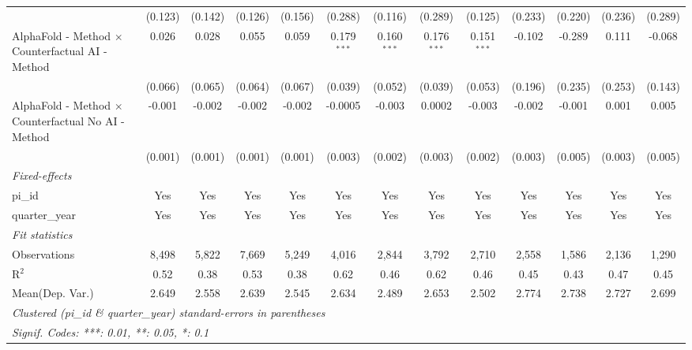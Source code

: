 \begin{tabular}{lcccccccccccc}
                                                              & (0.123)     & (0.142)      & (0.126)     & (0.156)      & (0.288)       & (0.116)       & (0.289)       & (0.125)       & (0.233) & (0.220) & (0.236) & (0.289)\\   
   AlphaFold - Method $\times$ Counterfactual AI - Method     & 0.026       & 0.028        & 0.055       & 0.059        & 0.179$^{***}$ & 0.160$^{***}$ & 0.176$^{***}$ & 0.151$^{***}$ & -0.102  & -0.289  & 0.111   & -0.068\\   
                                                              & (0.066)     & (0.065)      & (0.064)     & (0.067)      & (0.039)       & (0.052)       & (0.039)       & (0.053)       & (0.196) & (0.235) & (0.253) & (0.143)\\   
   AlphaFold - Method $\times$ Counterfactual No AI - Method  & -0.001      & -0.002       & -0.002      & -0.002       & -0.0005       & -0.003        & 0.0002        & -0.003        & -0.002  & -0.001  & 0.001   & 0.005\\   
                                                              & (0.001)     & (0.001)      & (0.001)     & (0.001)      & (0.003)       & (0.002)       & (0.003)       & (0.002)       & (0.003) & (0.005) & (0.003) & (0.005)\\   
   \midrule
   \emph{Fixed-effects}\\
   pi\_id                                                     & Yes         & Yes          & Yes         & Yes          & Yes           & Yes           & Yes           & Yes           & Yes     & Yes     & Yes     & Yes\\  
   quarter\_year                                              & Yes         & Yes          & Yes         & Yes          & Yes           & Yes           & Yes           & Yes           & Yes     & Yes     & Yes     & Yes\\  
   \midrule
   \emph{Fit statistics}\\
   Observations                                               & 8,498       & 5,822        & 7,669       & 5,249        & 4,016         & 2,844         & 3,792         & 2,710         & 2,558   & 1,586   & 2,136   & 1,290\\  
   R$^2$                                                      & 0.52        & 0.38         & 0.53        & 0.38         & 0.62          & 0.46          & 0.62          & 0.46          & 0.45    & 0.43    & 0.47    & 0.45\\  
Mean(Dep. Var.) & 2.649 & 2.558 & 2.639 & 2.545 & 2.634 & 2.489 & 2.653 & 2.502 & 2.774 & 2.738 & 2.727 & 2.699 \\
   \midrule \midrule
   \multicolumn{13}{l}{\emph{Clustered (pi\_id \& quarter\_year) standard-errors in parentheses}}\\
   \multicolumn{13}{l}{\emph{Signif. Codes: ***: 0.01, **: 0.05, *: 0.1}}\\
\end{tabular}
\par\endgroup
